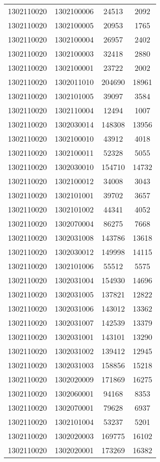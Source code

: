 \begin{longtable}{llcc}
1302110020 & 1302100006 & 24513 & 2092\\
1302110020 & 1302100005 & 20953 & 1765\\
1302110020 & 1302100004 & 26957 & 2402\\
1302110020 & 1302100003 & 32418 & 2880\\
1302110020 & 1302100001 & 23722 & 2002\\
1302110020 & 1302011010 & 204690 & 18961\\
1302110020 & 1302101005 & 39097 & 3584\\
1302110020 & 1302110004 & 12494 & 1007\\
1302110020 & 1302030014 & 148308 & 13956\\
1302110020 & 1302100010 & 43912 & 4018\\
1302110020 & 1302100011 & 52328 & 5055\\
1302110020 & 1302030010 & 154710 & 14732\\
1302110020 & 1302100012 & 34008 & 3043\\
1302110020 & 1302101001 & 39702 & 3657\\
1302110020 & 1302101002 & 44341 & 4052\\
1302110020 & 1302070004 & 86275 & 7668\\
1302110020 & 1302031008 & 143786 & 13618\\
1302110020 & 1302030012 & 149998 & 14115\\
1302110020 & 1302101006 & 55512 & 5575\\
1302110020 & 1302031004 & 154930 & 14696\\
1302110020 & 1302031005 & 137821 & 12822\\
1302110020 & 1302031006 & 143012 & 13362\\
1302110020 & 1302031007 & 142539 & 13379\\
1302110020 & 1302031001 & 143101 & 13290\\
1302110020 & 1302031002 & 139412 & 12945\\
1302110020 & 1302031003 & 158856 & 15218\\
1302110020 & 1302020009 & 171869 & 16275\\
1302110020 & 1302060001 & 94168 & 8353\\
1302110020 & 1302070001 & 79628 & 6937\\
1302110020 & 1302101004 & 53237 & 5201\\
1302110020 & 1302020003 & 169775 & 16102\\
1302110020 & 1302020001 & 173269 & 16382\\

\end{longtable}
